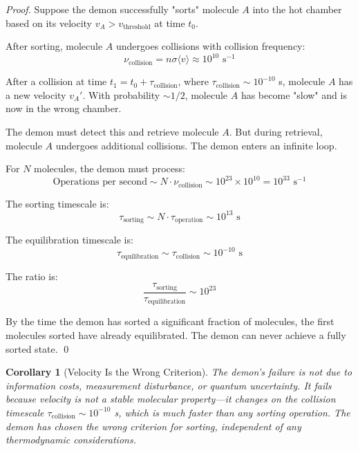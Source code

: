 \documentclass[12pt,a4paper]{article}
\newtheorem{corollary}[theorem]{Corollary}
\theoremstyle{definition}
\theoremstyle{remark}
\begin{document}
\begin{proof}
Suppose the demon successfully "sorts" molecule $A$ into the hot chamber based on its velocity $v_A > v_{\text{threshold}}$ at time $t_0$.

After sorting, molecule $A$ undergoes collisions with collision frequency:
\begin{equation}
\nu_{\text{collision}} = n \sigma \langle v \rangle \approx 10^{10} \text{ s}^{-1}
\end{equation}

After a collision at time $t_1 = t_0 + \tau_{\text{collision}}$, where $\tau_{\text{collision}} \sim 10^{-10}$ s, molecule $A$ has a new velocity $v_A'$. With probability $\sim 1/2$, molecule $A$ has become "slow" and is now in the wrong chamber.

The demon must detect this and retrieve molecule $A$. But during retrieval, molecule $A$ undergoes additional collisions. The demon enters an infinite loop.

For $N$ molecules, the demon must process:
\begin{equation}
\text{Operations per second} \sim N \cdot \nu_{\text{collision}} \sim 10^{23} \times 10^{10} = 10^{33} \text{ s}^{-1}
\end{equation}

The sorting timescale is:
\begin{equation}
\tau_{\text{sorting}} \sim N \cdot \tau_{\text{operation}} \sim 10^{13} \text{ s}
\end{equation}

The equilibration timescale is:
\begin{equation}
\tau_{\text{equilibration}} \sim \tau_{\text{collision}} \sim 10^{-10} \text{ s}
\end{equation}

The ratio is:
\begin{equation}
\frac{\tau_{\text{sorting}}}{\tau_{\text{equilibration}}} \sim 10^{23}
\end{equation}

By the time the demon has sorted a significant fraction of molecules, the first molecules sorted have already equilibrated. The demon can never achieve a fully sorted state. \qed
\end{proof}

\begin{corollary}[Velocity Is the Wrong Criterion]
\label{cor:wrong_criterion}
The demon's failure is not due to information costs, measurement disturbance, or quantum uncertainty. It fails because velocity is not a stable molecular property—it changes on the collision timescale $\tau_{\text{collision}} \sim 10^{-10}$ s, which is much faster than any sorting operation. The demon has chosen the wrong criterion for sorting, independent of any thermodynamic considerations.
\end{corollary}
\end{document}
